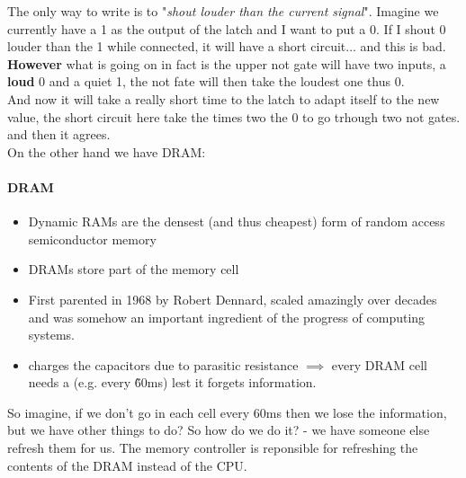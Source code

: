 The only way to write is to "\textit{shout louder than the current signal}".  Imagine we currently have a 1 as the output of the latch and I want to put a 0. If I shout 0 louder than the 1 while connected, it will have a short circuit... and this is bad. \textbf{However} what is going on in fact is the upper not gate will have two inputs, a \textbf{loud} 0 and a quiet 1, the not fate will then take the loudest one thus 0.\\
And now it will take a really short time to the latch to adapt itself to the new value, the short circuit here take the times two the 0 to go trhough two not gates. and then it agrees.\\

On the other hand we have DRAM:
\paragraph{DRAM}
\begin{itemize}
    \item  Dynamic RAMs are the densest (and thus cheapest) form of random access semiconductor memory 
    \item DRAMs store  part of the memory cell 
    \item First parented in 1968 by Robert Dennard, scaled amazingly over decades and was somehow an important ingredient of the progress of computing systems.
    \item charges  the capacitors due to parasitic resistance $\implies $ every DRAM cell needs a  (e.g. every \~60ms) lest it forgets information.
\end{itemize}
So imagine, if we don't go in each cell every 60ms then we lose the information, but we have other things to do? So how do we do it? - we have someone else refresh them for us. The memory controller is reponsible for refreshing the contents of the DRAM instead of the CPU.
